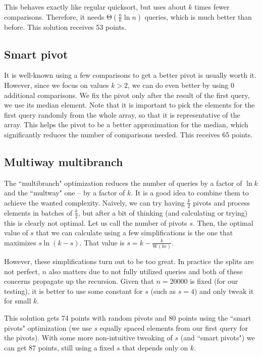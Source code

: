 \documentclass{article}
\begin{document}
This behaves exactly like regular quicksort, but uses about $ k $ times fewer comparisons. Therefore, it needs $ \mathrm{\Theta}\left( \frac{n}{k} \ln{n} \right) $ queries, which is much better than before. This solution receives 53 points.

\subsection{Smart pivot}

It is well-known using a few comparisons to get a better pivot is usually worth it. However, since we focus on values $ k > 2 $, we can do even better by using 0 additional comparisons. We fix the pivot only after the result of the first query, we use its median element. Note that it is important to pick the elements for the first query randomly from the whole array, so that it is representative of the array. This helps the pivot to be a better approximation for the median, which significantly reduces the number of comparisons needed. This receives 65 points.

\subsection{Multiway multibranch}

The ``multibranch" optimization reduces the number of queries by a factor of $ \ln{k} $ and the ``multway" one -- by a factor of $ k $. It is a good idea to combine them to achieve the wanted complexity. Naively, we can try having $ \frac{k}{2} $ pivots and process elements in batches of $ \frac{k}{2} $, but after a bit of thinking (and calculating or trying) this is clearly not optimal. Let us call the number of pivots $ s $. Then, the optimal value of $ s $ that we can calculate using a few simplifications is the one that maximizes $ s \ln{(k - s)} $. That value is $ s = k - \frac{k}{ \mathrm{W}(ke) } $.

However, these simplifications turn out to be too great. In practice the splits are not perfect, $ n $ also matters due to not fully utilized queries and both of these concerns propagate up the recursion. Given that $ n = 20000 $ is fixed (for our testing), it is better to use some constant for $ s $  (such as $ s = 4 $) and only tweak it for small $ k $.

This solution gets 74 points with random pivots and 80 points using the ``smart pivots" optimization (we use $ s $ equally spaced elements from our first query for the pivots). With some more non-intuitive tweaking of $ s $ (and ``smart pivots") we can get 87 points, still using a fixed $ s $ that depends only on $ k $.
\end{document}

